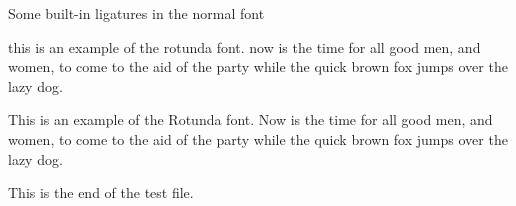 \documentclass{article}
\newcommand{\sentence}{%
this is an example of the rotunda font. now is the time for all good
men, and women, to come to the aid of the party while the quick brown fox
jumps over the lazy dog.}
\newcommand{\Sentence}{%
This is an example of the Rotunda font. Now is the time for all good
men, and women, to come to the aid of the party while the quick brown fox
jumps over the lazy dog.}
\newcommand{\esses}{sa sb sc sd se sf sg sh si sj sk sl sm 
                    sn so sp sq sr ss st su sv sw sx sy sz}
\newcommand{\exes}{xa xb xc xd xe xf xg xh xi xj xk xl xm 
                  xn xo xp xq xr xs xt xu xv xw xx xy xz}
\newcommand{\jays}{aj bj cj dj ej fj gj hj ij jj kj lj mj 
                   nj oj pj qj rj sj tj uj vj wj xj yj zj}
\newcommand{\dees}{ad bd cd dd ed fd gd hd id jd kd ld md 
                   nd od pd qd rd sd td ud vd wd xd yd zd}
\newcommand{\ares}{ra rb rc rd re rf rg rh ri rj rk rl rm 
                   rn ro rp rq rr rs rt ru rv rw rx ry rz}
\newcommand{\Esses}{SA SB SC SD SE SF SG SH SI SJ SK SL SM 
                    SN SO SP SQ SR SS ST SU SV SW SX SY SZ}
\newcommand{\Exes}{XA XB XC XD XE XF XG XH XI XJ XK XL XM 
                  XN XO XP XQ XR XS XT XU XV XW XX XY XZ}
\newcommand{\Jays}{AJ BJ CJ DJ EJ FJ GJ HJ IJ JJ KJ LJ MJ 
                   NJ OJ PJ QJ RJ SJ TJ UJ VJ WJ XJ YJ ZJ}
\newcommand{\Dees}{AD BD CD DD ED FD GD HD ID JD KD LD MD 
                   ND OD PD QD RD SD TD UD VD WD XD YD ZD}
\newcommand{\Ares}{RA RB RC RD RE RF RG RH RI RJ RK RL RM 
                   RN RO RP RQ RR RS RT RU RV RW RX RY RZ}
\begin{document}
\begin{center}
    Some built-in ligatures in the normal font \\
\end{center}


{
\rtndfamily 
\sentence{}

\Sentence{}
}
    
    This is the end of the test file.
\end{document}

